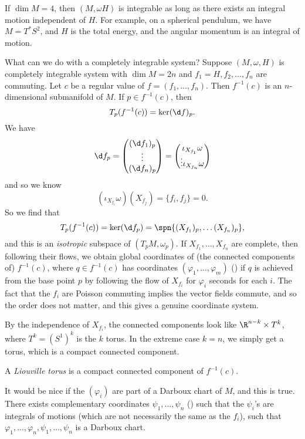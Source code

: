 \documentclass[a4paper]{article}
\begin{document}
\begin{eg}
  If $\dim M = 4$, then $(M, \omega H)$ is integrable as long as there exists an integral motion independent of $H$. For example, on a spherical pendulum, we have $M = T^* S^2$, and $H$ is the total energy, and the angular momentum is an integral of motion.
\end{eg}
What can we do with a completely integrable system? Suppose $(M, \omega, H)$ is completely integrable system with $\dim M = 2n$ and $f_1 = H, f_2, \ldots, f_n$ are commuting. Let $c$ be a regular value of $f = (f_1, \ldots, f_n)$. Then $f^{-1}(c)$ is an $n$-dimensional submanifold of $M$. If $p \in f^{-1}(c)$, then
\[
  T_p(f^{-1}(c)) = \ker (\d f)_p.
\]
We have
\[
  \d f_p =
  \begin{pmatrix}
    (\d f_1)_p\\
    \vdots\\
    (\d f_n)_p
  \end{pmatrix}
  =
  \begin{pmatrix}
    \iota_{X_{f_1}} \omega\\\vdots \iota_{X_{f_n}}\omega
  \end{pmatrix}
\]
and so we know
\[
  (\iota_{X_{f_i}} \omega) (X_{f_j}) = \{f_i, f_j\} = 0.
\]
So we find that
\[
  T_p (f^{-1}(c)) = \ker (\d f_p) = \spn \{(X_{f_1})_p, \ldots (X_{f_n})_p\},
\]
and this is an \emph{isotropic} subspace of $(T_p M, \omega_p)$. If $X_{f_1}, \ldots, X_{f_n}$ are complete, then following their flows, we obtain global coordinates of (the connected components of) $f^{-1}(c)$, where $q \in f^{-1}(c)$ has coordinates $(\varphi_1, \ldots, \varphi_m)$ () if $q$ is achieved from the base point $p$ by following the flow of $X_{f_i}$ for $\varphi_i$ seconds for each $i$. The fact that the $f_i$ are Poisson commuting implies the vector fields commute, and so the order does not matter, and this gives a genuine coordinate system.

By the independence of $X_{f_i}$, the connected components look like $\R^{n - k} \times T^k$, where $T^k = (S^1)^k$ is the $k$ torus. In the extreme case $k = n$, we simply get a torus, which is a compact connected component.

\begin{defi}
  A \emph{Liouville torus} is a compact connected component of $f^{-1}(c)$.
\end{defi}

It would be nice if the $(\varphi_i)$ are part of a Darboux chart of $M$, and this is true. There exists complementary coordinates $\psi_1, \ldots, \psi_n$ () such that the $\psi_i$'s are integrals of motions (which are not necessarily the same as the $f_i$), such that $\varphi_1, \ldots, \varphi_n, \psi_1, \ldots, \psi_n$ is a Darboux chart.
\end{document}
